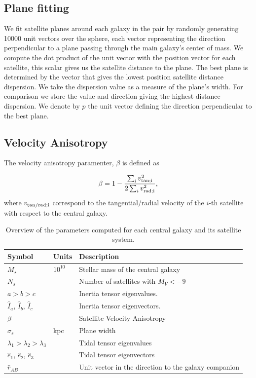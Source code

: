 \documentclass[a4paper,fleqn,usenatbib]{mnras}
\newcommand{\Msun}{{\ifmmode{{\rm{M_{\odot}}}}\else{${\rm{M_{\odot}}}$}\fi}}
\begin{document}

\subsection{Plane fitting}
\label{sub:planes}

We fit satellite planes around each galaxy in the pair by randomly
generating 10000 unit vectors over the  sphere, each vector
representing the direction perpendicular to a plane passing through
the main galaxy's center of mass. 
We compute the dot product of the unit vector with the position vector
for each satellite, this scalar gives us the satellite distance to the
plane. 
The best plane is determined by the vector that gives the lowest
position satellite distance dispersion. 
We take the dispersion value as a measure of the plane's width.
For comparison we store the value and direction giving the
highest distance dispersion.
We denote by $\hat{p}$ the unit vector defining the direction
perpendicular to the best plane.


\subsection{Velocity Anisotropy}
\label{sub:beta}

The velocity anisotropy paramenter, $\beta$ is defined as

\begin{equation}
  \beta = 1 - \frac{\sum_i v^2_{\rm{tan}; i}}{2\sum_i v^{2}_{\rm{rad};i}},
\label{eq:beta}
\end{equation}
% 
where $v_{\rm{tan/rad};i}$ correspond to the tangential/radial
velocity of the $i$-th satellite with respect to the central galaxy.



\begin{table}
  \centering
\begin{tabular}{lll}
\hline\hline
Symbol & Units & Description\\\hline
$M_{\star}$ & $10^{10}$\Msun & Stellar mass of the central galaxy\\
$N_s$ & & Number of satellites with $M_V<-9$\\
$a > b> c$ & & Inertia tensor eigenvalues. \\
$\hat{I}_a$, $\hat{I}_b$, $\hat{I}_c$ & & Inertia tensor eigenvectors. \\
$\beta$  &  & Satellite Velocity Anisotropy\\
$\sigma_s$ & kpc & Plane width\\
$\lambda_1>\lambda_2>\lambda_3$ &  & Tidal tensor
eigenvalues\\
$\hat{e}_{1}$,  $\hat{e}_{2}$,  $\hat{e}_{3}$ &  & Tidal tensor
eigenvectors\\ 
$\hat{r}_{AB}$& & Unit vector in the direction to the galaxy companion\\
\hline\hline
\end{tabular}
  \caption{Overview of the parameters computed for each central galaxy
    and its satellite system.
  \label{tab:models}}
\end{table}
\end{document}
